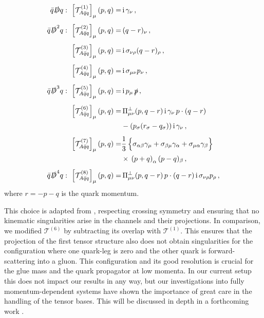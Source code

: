 \documentclass[aps,twocolumn,prd,superscriptaddress]{revtex4-2}
\begin{document}
\begin{alignat}{2}
	\bar q\slashed D q:\  \left[\mathcal{T}_{A\bar{q}q}^{(1)}\right]_\mu(p,q) =&\,\textrm{i}\,\gamma_\nu
\,,\notag                                                                                              \\[1ex]
	\bar q\slashed D^2 q:\  \left[\mathcal{T}_{A\bar{q}q}^{(2)}\right]_\mu(p,q)  =&\,
	(q-r)_\nu
	\,,\notag                                                                                              \\[1ex]
	\left[\mathcal{T}_{A\bar{q}q}^{(3)}\right]_\mu(p,q) =&\,\textrm{i}\,\sigma_{\nu\rho}(q-r)_\rho
	\,,\notag                                                                                              \\[1ex]
	\left[\mathcal{T}_{A\bar{q}q}^{(4)}\right]_\mu(p,q) =&\,\textrm{i}\,\sigma_{\mu\nu}p_\nu
	\,,\notag                                                                                              \\[1ex]
	\bar q\slashed D^3 q:\  \left[\mathcal{T}_{A\bar{q}q}^{(5)}\right]_\mu(p,q) =&\,\textrm{i}\,p_\mu\,\slashed p
	\,,\notag                                                                                              \\[1ex]
	\left[\mathcal{T}_{A\bar{q}q}^{(6)}\right]_\mu(p,q)  =&\,\Pi^\perp_{\mu\nu}(p,q-r)\,\textrm{i}\,\gamma_\nu\,p\cdot(q-r)
	\notag\\
	&- (p_\sigma (r_\sigma - q_\sigma)) \,\textrm{i}\,\gamma_\nu
	\,,\notag                                                                                              \\[1ex]
	\left[\mathcal{T}_{A\bar{q}q}^{(7)}\right]_\mu(p,q) =&\frac{{\textrm{1}}}{3}\, \Big\{ \sigma_{\alpha\beta}\gamma_\mu + \sigma_{\beta\mu}\gamma_\alpha + \sigma_{\mu\alpha}\gamma_\beta \Big\}\notag\\&\times \,\left({p+q}\right)_\alpha (p-q)_\beta
	\,,\notag                                                                                              \\[1ex]
	\bar q\slashed D^4 q:\  \left[\mathcal{T}_{A\bar{q}q}^{(8)}\right]_\mu(p,q) =&\,\Pi^\perp_{\mu\nu}(p,q-r)\, p\cdot(q-r)\,\textrm{i}\,\sigma_{\nu\rho}p_\rho
	\,,
	\label{eq:Quark-Gluon}
\end{alignat}
%
where $r = -p - q$ is the quark momentum.

This choice is adapted from \cite{Eichmann:2016yit}, respecting crossing symmetry and ensuring that no kinematic singularities arise in the channels and their projections. In comparison, we modified $\mathcal{T}^{(6)}$ by subtracting its overlap with $\mathcal{T}^{(1)}$. This ensures that the projection of the first tensor structure also does not obtain singularities for the configuration where one quark-leg is zero and the other quark is forward-scattering into a gluon. This configuration and its good resolution is crucial for the glue mass and the quark propagator at low momenta. In our current setup this does not impact our results in any way, but our investigations into fully momentum-dependent systems have shown the importance of great care in the handling of the tensor bases.
This will be discussed in depth in a forthcoming work \cite{?SW2024}.
\end{document}
